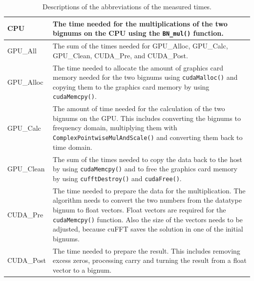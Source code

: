 \documentclass[12pt,a4paper]{article}
\begin{document}
\begin{table}
\centering
\caption{Descriptions of the abbreviations of the measured times.}
\vspace{0.5cm}
\label{Description}
\begin{tabular}{p{2cm}|p{9.0cm}|}
\cline{1-2}
 \multicolumn{1}{|l|}{CPU} & The time needed for the multiplications of the two bignums on the CPU using the \texttt{BN_mul()} function. \\ \hline
 \multicolumn{1}{|l|}{GPU\_All} & The sum of the times needed for GPU\_Alloc, GPU\_Calc, GPU\_Clean, CUDA\_Pre, and CUDA\_Post. \\ \hline
 \multicolumn{1}{|l|}{GPU\_Alloc} & The time needed to allocate the amount of graphics card memory needed for the two bignums using \texttt{cudaMalloc()} and copying them to the graphics card memory by using \texttt{cudaMemcpy()}.
 \\ \hline
 \multicolumn{1}{|l|}{GPU\_Calc} & The amount of time needed for the calculation of the two bignums on the GPU. This includes converting the bignums to frequency domain, multiplying them with \texttt{ComplexPointwiseMulAndScale()} and converting them back to time domain. \\ \hline
 \multicolumn{1}{|l|}{GPU\_Clean} & The sum of the times needed to copy the data back to the host by using \texttt{cudaMemcpy()} and to free the graphics card memory by using \texttt{cufftDestroy()} and \texttt{cudaFree()}.\\ \hline
 \multicolumn{1}{|l|}{CUDA\_Pre} & The time needed to prepare the data for the multiplication. The algorithm needs to convert the two numbers from the datatype bignum to float vectors. Float vectors are required for the \texttt{cudaMemcpy()} function. Also the size of the vectors needs to be adjusted, because cuFFT saves the solution in one of the initial bignums. \\ \hline
 \multicolumn{1}{|l|}{CUDA\_Post} & The time needed to prepare the result. This includes removing excess zeros, processing carry and turning the result from a float vector to a bignum. \\ \hline
\end{tabular}
\end{table}
\end{document}

